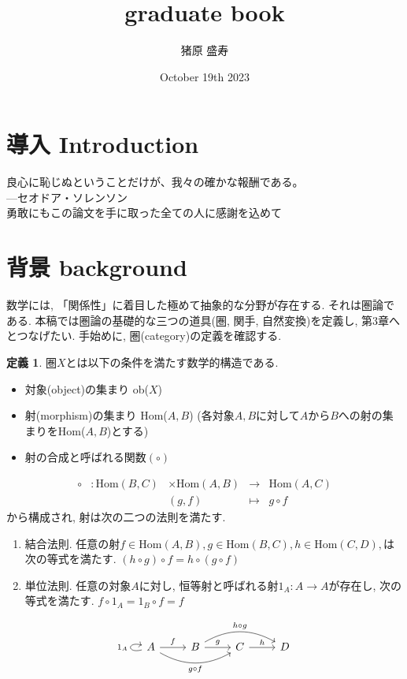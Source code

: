 \documentclass[a4paper]{jsarticle}
\title{graduate book}
\author{猪原 盛寿}
\date{October 19th 2023}
\theoremstyle{definition}
\newtheorem{dfn}{定義}[section]
\newcommand{\Hom}{{\mathrm{Hom}}}
\begin{document}
\Large
\maketitle

\section{導入 Introduction}
良心に恥じぬということだけが、我々の確かな報酬である。\\
---セオドア・ソレンソン\\
勇敢にもこの論文を手に取った全ての人に感謝を込めて
\section{背景 background}
数学には, 「関係性」に着目した極めて抽象的な分野が存在する. それは圏論である. 本稿では圏論の基礎的な三つの道具(圏, 関手, 自然変換)を定義し, 第3章へとつなげたい. 手始めに, 圏(category)の定義を確認する.
\begin{dfn}
圏$X$とは以下の条件を満たす数学的構造である. 
\begin{itemize}
    \item 対象(object)の集まり ob($X$)
    \item 射(morphism)の集まり Hom($A,B$)
    (各対象$A, B$に対して$A$から$B$への射の集まりをHom($A, B$)とする)
    \item 射の合成と呼ばれる関数$(\circ)$
\end{itemize}
\begin{equation}
    \begin{array}{lllll}
     \circ &: \Hom (B, C) &\times \Hom (A, B) &\rightarrow &\Hom (A, C)  \\
         &    & (g,f) & \mapsto&  g\circ f
\end{array}
\end{equation}
から構成され, 射は次の二つの法則を満たす.
\begin{enumerate}[(1)]
    \item 結合法則. 任意の射$f\in \Hom(A,B), g\in \Hom(B,C), h\in \Hom(C,D),$は次の等式を満たす. $(h \circ g) \circ f = h \circ (g \circ f)$  
    \item 単位法則. 任意の対象$A$に対し, 恒等射と呼ばれる射$1_A:A\rightarrow A$が存在し, 次の等式を満たす.  $f\circ 1_A = 1_B\circ f = f$  
\end{enumerate}
\begin{equation}
    \begin{tikzcd}
    A\ar{r}{f} \ar[loop left,"1_A"] \ar[bend right=30,swap]{rr}{g\circ f}& B\ar{r}{g} \ar[bend left=30]{rr}{h\circ g}& C\ar{r}{h} & D
\end{tikzcd}
\end{equation}
\end{dfn}
\end{document}
